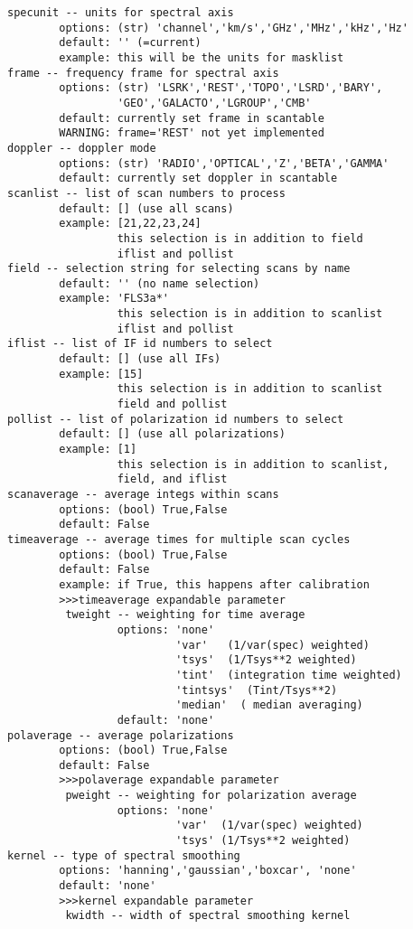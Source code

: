 \begin{verbatim}
specunit -- units for spectral axis
        options: (str) 'channel','km/s','GHz','MHz','kHz','Hz'
        default: '' (=current)
        example: this will be the units for masklist
frame -- frequency frame for spectral axis
        options: (str) 'LSRK','REST','TOPO','LSRD','BARY',
                 'GEO','GALACTO','LGROUP','CMB'
        default: currently set frame in scantable
        WARNING: frame='REST' not yet implemented
doppler -- doppler mode
        options: (str) 'RADIO','OPTICAL','Z','BETA','GAMMA'
        default: currently set doppler in scantable
scanlist -- list of scan numbers to process
        default: [] (use all scans)
        example: [21,22,23,24]
                 this selection is in addition to field
                 iflist and pollist
field -- selection string for selecting scans by name
        default: '' (no name selection)
        example: 'FLS3a*'
                 this selection is in addition to scanlist
                 iflist and pollist
iflist -- list of IF id numbers to select
        default: [] (use all IFs)
        example: [15]
                 this selection is in addition to scanlist
                 field and pollist
pollist -- list of polarization id numbers to select
        default: [] (use all polarizations)
        example: [1]
                 this selection is in addition to scanlist,
                 field, and iflist
scanaverage -- average integs within scans
        options: (bool) True,False
        default: False
timeaverage -- average times for multiple scan cycles
        options: (bool) True,False
        default: False
        example: if True, this happens after calibration
        >>>timeaverage expandable parameter
         tweight -- weighting for time average
                 options: 'none'
                          'var'   (1/var(spec) weighted)
                          'tsys'  (1/Tsys**2 weighted)
                          'tint'  (integration time weighted)
                          'tintsys'  (Tint/Tsys**2)
                          'median'  ( median averaging)
                 default: 'none'
polaverage -- average polarizations
        options: (bool) True,False
        default: False
        >>>polaverage expandable parameter
         pweight -- weighting for polarization average
                 options: 'none'
                          'var'  (1/var(spec) weighted)
                          'tsys' (1/Tsys**2 weighted)
kernel -- type of spectral smoothing
        options: 'hanning','gaussian','boxcar', 'none'
        default: 'none'
        >>>kernel expandable parameter
         kwidth -- width of spectral smoothing kernel

\end{verbatim}
